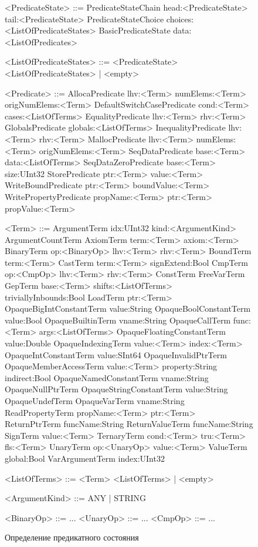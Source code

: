 \begin{figure}
	\begin{grammar}
	\scriptsize
	<PredicateState> ::= PredicateStateChain head:<PredicateState> tail:<PredicateState>
	\alt PredicateStateChoice choices:<ListOfPredicateStates>
	\alt BasicPredicateState data:<ListOfPredicates>

	<ListOfPredicateStates> ::= <PredicateState> <ListOfPredicateStates> | <empty>

	<Predicate> ::= AllocaPredicate lhv:<Term> numElems:<Term> origNumElems:<Term>
	\alt DefaultSwitchCasePredicate cond:<Term> cases:<ListOfTerms>
	\alt EqualityPredicate lhv:<Term> rhv:<Term>
	\alt GlobalsPredicate globals:<ListOfTerms>
	\alt InequalityPredicate lhv:<Term> rhv:<Term>
	\alt MallocPredicate lhv:<Term> numElems:<Term> origNumElems:<Term>
	\alt SeqDataPredicate base:<Term> data:<ListOfTerms>
	\alt SeqDataZeroPredicate base:<Term> size:UInt32
	\alt StorePredicate ptr:<Term> value:<Term>
	\alt WriteBoundPredicate ptr:<Term> boundValue:<Term>
	\alt WritePropertyPredicate propName:<Term> ptr:<Term> propValue:<Term>
	
	\tiny
	<Term> ::= ArgumentTerm idx:UInt32 kind:<ArgumentKind>
	\alt ArgumentCountTerm
	\alt AxiomTerm term:<Term> axiom:<Term>
	\alt BinaryTerm op:<BinaryOp> lhv:<Term> rhv:<Term>
	\alt BoundTerm term:<Term>
	\alt CastTerm term:<Term> signExtend:Bool
	\alt CmpTerm op:<CmpOp> lhv:<Term> rhv:<Term>
	\alt ConstTerm
	\alt FreeVarTerm
	\alt GepTerm base:<Term> shifts:<ListOfTerms> triviallyInbounds:Bool
	\alt LoadTerm ptr:<Term>
	\alt OpaqueBigIntConstantTerm value:String
	\alt OpaqueBoolConstantTerm value:Bool
	\alt OpaqueBuiltinTerm vname:String
	\alt OpaqueCallTerm func:<Term> args:<ListOfTerms>
	\alt OpaqueFloatingConstantTerm value:Double
	\alt OpaqueIndexingTerm value:<Term> index:<Term>
	\alt OpaqueIntConstantTerm value:SInt64
	\alt OpaqueInvalidPtrTerm
	\alt OpaqueMemberAccessTerm value:<Term> property:String indirect:Bool
	\alt OpaqueNamedConstantTerm vname:String
	\alt OpaqueNullPtrTerm 
	\alt OpaqueStringConstantTerm value:String
	\alt OpaqueUndefTerm 
	\alt OpaqueVarTerm vname:String
	\alt ReadPropertyTerm propName:<Term> ptr:<Term>
	\alt ReturnPtrTerm funcName:String
	\alt ReturnValueTerm funcName:String
	\alt SignTerm value:<Term>
	\alt TernaryTerm cond:<Term> tru:<Term> fls:<Term>
	\alt UnaryTerm op:<UnaryOp> value:<Term>
	\alt ValueTerm global:Bool
	\alt VarArgumentTerm index:UInt32

	<ListOfTerms> ::= <Term> <ListOfTerms> | <empty>

	<ArgumentKind> ::= ANY | STRING

	<BinaryOp> ::= ...
	<UnaryOp> ::= ...
	<CmpOp> ::= ...
	\end{grammar}
	
\caption{Определение предикатного состояния}
\label{image:predicate-state-definition}
\end{figure}


